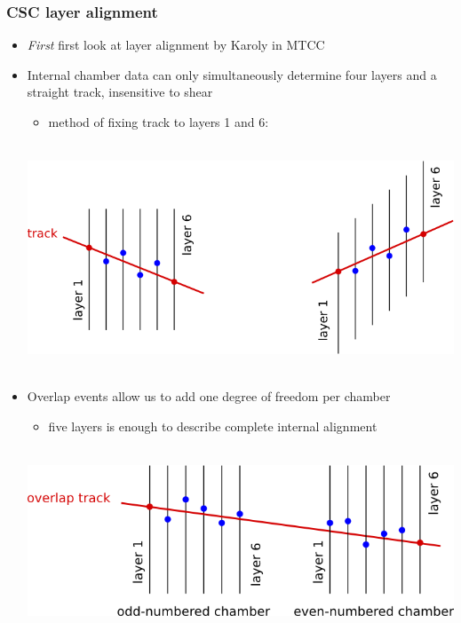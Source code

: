 \documentclass[compress]{beamer}
\begin{document}
\begin{frame}
\frametitle{CSC layer alignment}

\begin{itemize}
\item {\it First} first look at layer alignment by Karoly in MTCC
\item Internal chamber data can only simultaneously determine four
  layers and a straight track, insensitive to shear
\begin{itemize}
\item method of fixing track to layers 1 and 6:
\end{itemize}

\vspace{-0.5 cm}
\mbox{ } \hfill \includegraphics[width=0.65\linewidth]{layer_alignment_skew.png} \hfill \mbox{ }

\item Overlap events allow us to add one degree of freedom per chamber
\begin{itemize}
\item five layers is enough to describe complete internal alignment
\end{itemize}

\mbox{ } \hfill \includegraphics[width=0.65\linewidth]{layer_alignment_noskew.png} \hfill \hfill \hfill \mbox{ }

\end{itemize}
\end{frame}
\end{document}
